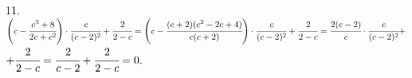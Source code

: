11. $\left(c-\cfrac{c^3+8}{2c+c^2}\right)\cdot\cfrac{c}{(c-2)^2}+\cfrac{2}{2-c}=
\left(c-\cfrac{(c+2)(c^2-2c+4)}{c(c+2)}\right)\cdot\cfrac{c}{(c-2)^2}+\cfrac{2}{2-c}=
\cfrac{2(c-2)}{c}\cdot\cfrac{c}{(c-2)^2}+$\\$+\cfrac{2}{2-c}=\cfrac{2}{c-2}+\cfrac{2}{2-c}=0.$\\
